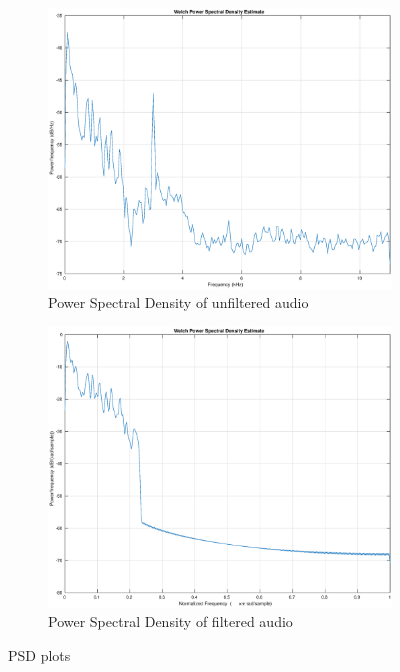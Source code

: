 \documentclass{article}
\begin{document}
\begin{figure}[H]
    \centering
    \begin{subfigure}[b]{0.45\textwidth}
        \centering
        \includegraphics[width=\textwidth]{audio_freq}
        \caption{Power Spectral Density of unfiltered audio}
        \label{fig:psd1}
    \end{subfigure}
    \hfill
    \begin{subfigure}[b]{0.45\textwidth}
        \centering
        \includegraphics[width=\textwidth]{audio_lpf}
        \caption{Power Spectral Density of filtered audio}
        \label{fig:psd2}
    \end{subfigure}
    \caption{PSD plots}
\end{figure}
\end{document}
